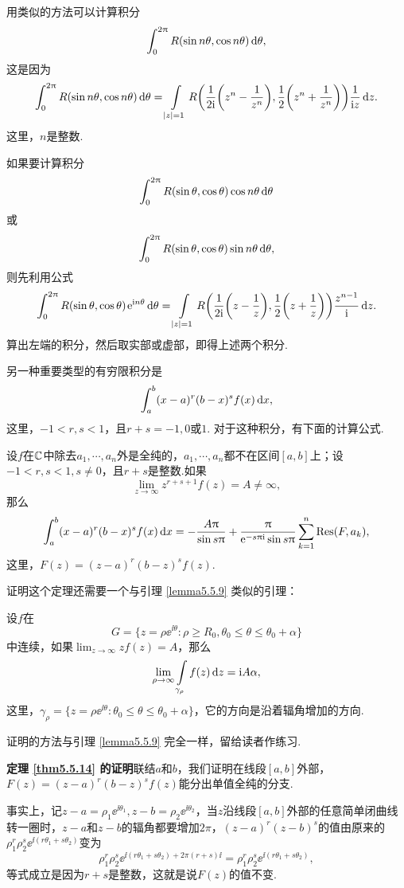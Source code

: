 用类似的方法可以计算积分
\[
  \int_0^{2\uppi}R(\sin n\theta,\cos n\theta)\mathop{}\!\mathrm{d} \theta,
\]
这是因为
\[
  \int_0^{2\uppi}R(\sin n\theta,\cos n\theta)\mathop{}\!\mathrm{d} \theta=
  \int\limits_{|z|=1}R\bigg(\frac1{2\mathrm i}\bigg(z^n-\frac1{z^n}\bigg),
  \frac12\bigg(z^n+\frac1{z^n}\bigg)\bigg)\frac1{\mathrm i z}\mathop{}\!\mathrm dz.
\]
这里，$n$是整数.

如果要计算积分
\[
  \int_0^{2\uppi}R(\sin \theta,\cos \theta)\cos n\theta\mathop{}\!\mathrm{d} \theta
\]
或
\[
  \int_0^{2\uppi}R(\sin \theta,\cos \theta)\sin n\theta\mathop{}\!\mathrm{d} \theta,
\]
则先利用公式
\begin{equation}\label{eq5.5.10}
  \int_0^{2\uppi}R(\sin\theta,\cos\theta)\operatorname{\!\!\;\mathrm e}^{\mathrm i n\theta}\mathop{}\!\mathrm{d} \theta =
  \int\limits_{|z|=1}R\bigg(\frac1{2\mathrm i}\bigg(z-\frac1z\bigg),
  \frac12\bigg(z+\frac1z\bigg)\bigg)\frac{z^{n-1}}{\mathrm i}\mathop{}\!\mathrm dz.
\end{equation}
算出左端的积分，然后取实部或虚部，即得上述两个积分.

另一种重要类型的有穷限积分是
\[
  \int_a^b(x-a)^r(b-x)^sf(x)\mathop{}\!\mathrm dx,
\]
这里，$-1<r,s<1$，且$r+s=-1,0$或$1$. 对于这种积分，有下面的计算公式.

\begin{theorem}\label{thm5.5.14}
  设$f$在$\mathbb C$中除去$a_1,\cdots,a_n$外是全纯的，$a_1,\cdots,a_n$都不在区间$[a,b]$上；设$-1<r,s<1,s\ne0$，且$r+s$是整数.如果
  \[
    \lim_{z\to\infty}z^{r+s+1}f(z) = A\ne\infty,
  \]
  那么
  \begin{equation}\label{eq5.5.11}
    \int_a^b(x-a)^r(b-x)^sf(x)\mathop{}\!\mathrm dx = -\frac{A\uppi}{\sin s\uppi}+\frac{\uppi}{\operatorname{\!\!\;\mathrm e}^{-s\uppi\mathrm i}\sin
    s\uppi}\sum_{k=1}^n\operatorname*{Res}(F,a_k),
  \end{equation}
  这里，$F(z)=(z-a)^r(b-z)^sf(z)$.
\end{theorem}

证明这个定理还需要一个与引理 \ref{lemma5.5.9} 类似的引理：
\begin{lemma}\label{lemma5.5.15}
  设$f$在
  \[
    G = \{z=\rho\ee^{\ii\theta}:\rho\ge R_0,\theta_0\le\theta\le\theta_0+\alpha\}
  \]
  中连续，如果$\lim_{z\to\infty}zf(z)=A$，那么
  \[
    \lim_{\rho\to\infty}\int\limits_{\gamma_\rho}f(z)\mathop{}\!\mathrm dz=\mathrm i A\alpha,
  \]
  这里，$\gamma_\rho=\{z=\rho\ee^{\ii\theta}:\theta_0\le\theta\le\theta_0+\alpha\}$，它的方向是沿着辐角增加的方向.
\end{lemma}

证明的方法与引理 \ref{lemma5.5.9} 完全一样，留给读者作练习.

\textbf{定理 \ref{thm5.5.14} 的证明}\quad 联结$a$和$b$，我们证明在线段$[a,b]$外部，$F(z)=(z-a)^r(b-z)^sf(z)$能分出单值全纯的分支.

事实上，记$z-a=\rho_1\ee^{\ii\theta_1},z-b=\rho_2\ee^{\ii\theta_2}$，当$z$沿线段$[a,b]$外部的任意简单闭曲线转一圈时，$z-a$和$z-b$的辐角都要增加$2\pi$，$(z-a)^r(z-b)^s$的值由原来的$\rho_1^r\rho_2^s\ee^{\ii(r\theta_1+s\theta_2)}$变为
\[
  \rho_1^r\rho_2^s\ee^{\ii(r\theta_1+s\theta_2)+2\pi(r+s)\ii} = 
  \rho_1^r\rho_2^s\ee^{\ii(r\theta_1+s\theta_2)},
\]
等式成立是因为$r+s$是整数，这就是说$F(z)$的值不变.

